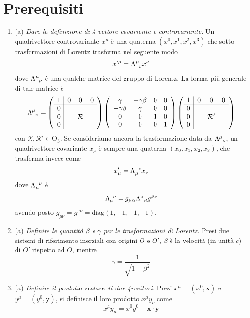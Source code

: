\documentclass{article}
\renewcommand{\a}{(a)}
\renewcommand{\t}[1]{\textit{ #1}}
\renewcommand{\vec}[1]{\mathbf{#1}}
\begin{document}
	\section{Prerequisiti}
	\begin{enumerate}
		\item \a \t{Dare la definizione di 4-vettore covariante e controvariante.}
		Un quadrivettore controvariante $x^\mu$ è una quaterna $(x^0,x^1,x^2,x^3)$ che sotto trasformazioni di Lorentz trasforma nel seguente modo
		\[x'^{\mu}=\tensor{\Lambda}{^\mu_\nu}x^\nu\]
		dove $\tensor{\Lambda}{^\mu_\nu}$ è una qualche matrice del gruppo di Lorentz. La forma più generale di tale matrice è
		\[\tensor{\Lambda}{^\mu_\nu}=\left(\begin{array}{c | c c c}
		1&0&0&0\\\hline0&&&\\0&&\mathcal{R}&\\0&&&
		\end{array}\right)\left(\begin{array}{c c c c}
		\gamma&-\gamma\beta&0&0\\-\gamma\beta&\gamma&0&0\\0&0&1&0\\0&0&0&1
		\end{array}\right)\left(\begin{array}{c | c c c}
		1&0&0&0\\\hline0&&&\\0&&\mathcal{R}'&\\0&&&
		\end{array}\right)\]
		con $\mathcal{R},\mathcal{R}'\in\mathrm{O}_3$. Se consideriamo ancora la trasformazione data da $\tensor{\Lambda}{^\mu_\nu}$, un quadrivettore covariante $x_\mu$ è sempre una quaterna $(x_0,x_1,x_2,x_3)$, che trasforma invece come
		\[x'_\mu=\tensor{\Lambda}{_\mu^\nu}x_\nu\]
		dove $\tensor{\Lambda}{_\mu^\nu}$ è
		\[\tensor{\Lambda}{_\mu^\nu}=g_{\mu\alpha}\tensor{\Lambda}{^\alpha_\beta}g^{\beta\nu}\]
		avendo posto $g_{\mu\nu}=g^{\mu\nu}=\textrm{diag}(1,-1,-1,-1)$.
		\item \a\t{Definire le quantità $\beta$ e $\gamma$ per le trasformazioni di Lorentz.} Presi due sistemi di riferimento inerziali con origini $O$ e $O'$, $\beta$ è la velocità (in unità $c$) di $O'$ rispetto ad $O$, mentre
		\[\gamma=\frac{1}{\sqrt{1-\beta^2}}\]
		\item\a\t{Definire il prodotto scalare di due 4-vettori.} Presi $x^\mu=(x^0,\vec{x})$ e $y^\mu=(y^0,\vec{y})$, si definisce il loro prodotto $x^\mu y_\nu$ come
		\[x^\mu y_\mu=x^0y^0-\vec{x}\cdot\vec{y}\]

\end{enumerate}
\end{document}
